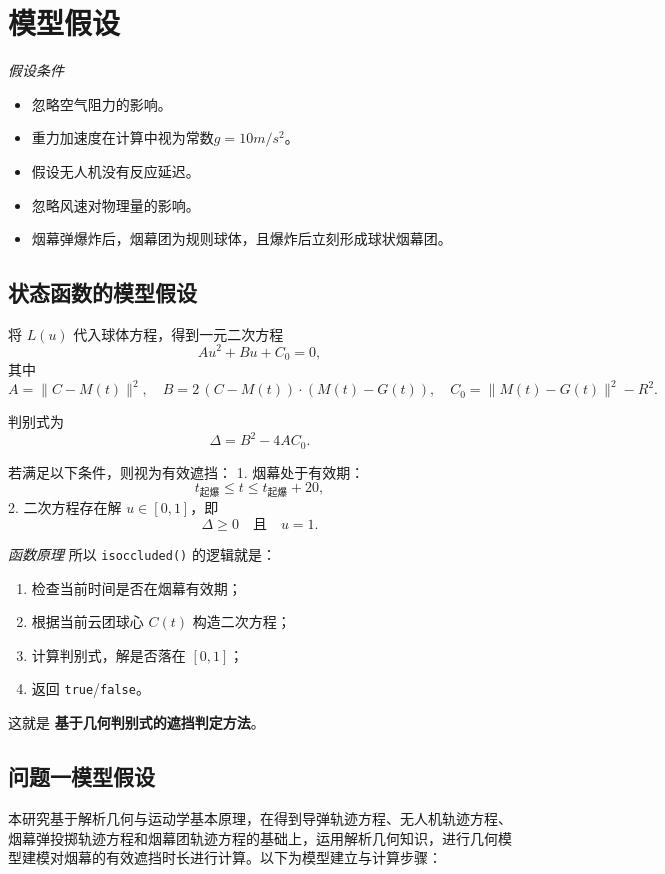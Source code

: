 \documentclass{article}
\begin{document}
\section{模型假设}

\textit{假设条件}
\begin{itemize}
    \item 忽略空气阻力的影响。
    \item 重力加速度在计算中视为常数$g = 10m/s^2$。
    \item 假设无人机没有反应延迟。
    \item 忽略风速对物理量的影响。
    \item 烟幕弹爆炸后，烟幕团为规则球体，且爆炸后立刻形成球状烟幕团。
\end{itemize}
\subsection{状态函数的模型假设}
将 $L(u)$ 代入球体方程，得到一元二次方程
\[
A u^2 + B u + C_0 = 0,
\]
其中
\[
A = \|C - M(t)\|^2, \quad
B = 2\,(C - M(t)) \cdot (M(t) - G(t)), \quad
C_0 = \|M(t) - G(t)\|^2 - R^2.
\]

判别式为
\[
\Delta = B^2 - 4AC_0.
\]

若满足以下条件，则视为有效遮挡：
1. 烟幕处于有效期：
\[
t_{\text{起爆}} \leq t \leq t_{\text{起爆}} + 20,
\]
2. 二次方程存在解 $u \in [0,1]$，即
\[
\Delta \geq 0 \quad \text{且} \quad u = 1.
\]

\textit{函数原理}
所以 \texttt{isoccluded()} 的逻辑就是：

\begin{enumerate}[leftmargin=*,label=\arabic*.]
  \item 检查当前时间是否在烟幕有效期；
  \item 根据当前云团球心 \(C(t)\) 构造二次方程；
  \item 计算判别式，解是否落在 \([0,1]\)；
  \item 返回 \texttt{true}/\texttt{false}。
\end{enumerate}

这就是 \textbf{基于几何判别式的遮挡判定方法}。

\subsection{问题一模型假设}

本研究基于解析几何与运动学基本原理，在得到导弹轨迹方程、无人机轨迹方程、烟幕弹投掷轨迹方程和烟幕团轨迹方程的基础上，运用解析几何知识，进行几何模型建模对烟幕的有效遮挡时长进行计算。以下为模型建立与计算步骤：
\end{document}
